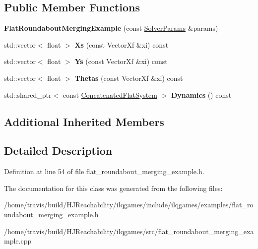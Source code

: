 \subsection*{Public Member Functions}
\begin{DoxyCompactItemize}
\item 
{\bfseries Flat\+Roundabout\+Merging\+Example} (const \hyperlink{structilqgames_1_1_solver_params}{Solver\+Params} \&params)\hypertarget{classilqgames_1_1_flat_roundabout_merging_example_a5ffaedb25170626fec0772e12b9294ea}{}\label{classilqgames_1_1_flat_roundabout_merging_example_a5ffaedb25170626fec0772e12b9294ea}

\item 
std\+::vector$<$ float $>$ {\bfseries Xs} (const Vector\+Xf \&xi) const \hypertarget{classilqgames_1_1_flat_roundabout_merging_example_a19509a51bc48488fad8eb10c979004e7}{}\label{classilqgames_1_1_flat_roundabout_merging_example_a19509a51bc48488fad8eb10c979004e7}

\item 
std\+::vector$<$ float $>$ {\bfseries Ys} (const Vector\+Xf \&xi) const \hypertarget{classilqgames_1_1_flat_roundabout_merging_example_a0f9ec2bd40585eed90f7e6b73d31c1a1}{}\label{classilqgames_1_1_flat_roundabout_merging_example_a0f9ec2bd40585eed90f7e6b73d31c1a1}

\item 
std\+::vector$<$ float $>$ {\bfseries Thetas} (const Vector\+Xf \&xi) const \hypertarget{classilqgames_1_1_flat_roundabout_merging_example_a389cbee0a71f7149c7550a5ea39201a2}{}\label{classilqgames_1_1_flat_roundabout_merging_example_a389cbee0a71f7149c7550a5ea39201a2}

\item 
std\+::shared\+\_\+ptr$<$ const \hyperlink{classilqgames_1_1_concatenated_flat_system}{Concatenated\+Flat\+System} $>$ {\bfseries Dynamics} () const \hypertarget{classilqgames_1_1_flat_roundabout_merging_example_abb8e4df38141924f3072e9151b6b349e}{}\label{classilqgames_1_1_flat_roundabout_merging_example_abb8e4df38141924f3072e9151b6b349e}

\end{DoxyCompactItemize}
\subsection*{Additional Inherited Members}


\subsection{Detailed Description}


Definition at line 54 of file flat\+\_\+roundabout\+\_\+merging\+\_\+example.\+h.



The documentation for this class was generated from the following files\+:\begin{DoxyCompactItemize}
\item 
/home/travis/build/\+H\+J\+Reachability/ilqgames/include/ilqgames/examples/flat\+\_\+roundabout\+\_\+merging\+\_\+example.\+h\item 
/home/travis/build/\+H\+J\+Reachability/ilqgames/src/flat\+\_\+roundabout\+\_\+merging\+\_\+example.\+cpp\end{DoxyCompactItemize}
